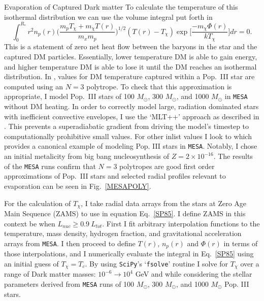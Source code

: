 \documentclass[a4paper,11pt]{article}
\begin{document}
\begin{section}{Evaporation of Captured Dark matter}
    To calculate the temperature of this isothermal distribution we can use the volume integral put forth in \cite{Spergel:1985}
    \begin{equation}
        \int_0^{R_*} r^2 n_p(r) \bigg(\frac{m_p T_\chi + m_\chi T(r)}{m_x m_p} \bigg)^{1/2} (T(r) - T_\chi) \exp \Big[ \frac{-m_\chi \Phi(r)}{k T_\chi} \Big] dr = 0.
        \label{SP85}
    \end{equation}
    This is a statement of zero net heat flow between the baryons in the star and the captured DM particles.
    Essentially, lower temperature DM is able to gain energy, and higher temperature DM is able to lose it until the DM reaches an isothermal distribution.
    In \cite{Ilie:2020popiii}, values for DM temperature captured within a Pop.~III star are computed using an $N=3$ polytrope.
    To check that this approximation is appropriate, I model Pop.~III stars of 100 $M_{\odot}$, 300 $M_{\odot}$, and 1000 $M_{\odot}$ in \texttt{MESA} without DM heating.
    In order to correctly model large, radiation dominated stars with inefficient convective envelopes, I use the `MLT++' approach as described in \cite{MESA:2013}.
    This prevents a superadiabatic gradient from driving the model's timestep to computationally prohibitive small values.
    For other inlist values I look to \cite{Windhorst:2019} which provides a canonical example of modeling Pop. III stars in \texttt{MESA}.
    Notably, I chose an initial metalicity from big bang nucleosynthesis of $Z = 2 \times 10^{-16}$.
    The results of the \texttt{MESA} runs confirm that $N=3$ polytropes are good first order approximations of Pop.~III stars and selected radial profiles relevant to evaporation can be seen in Fig.~\ref{MESAPOLY}.
    
    For the calculation of $T_\chi$, I take radial data arrays from the stars at Zero Age Main Sequence (ZAMS) to use in equation Eq.~\ref{SP85}.
    I define ZAMS in this context be when $L_{nuc} \geq 0.9 ~ L_{tot}$.
    First I fit arbitrary interpolation functions to the temperature, mass density, hydrogen fraction, and gravitational acceleration arrays from \texttt{MESA}.
    I then proceed to define $T(r)$, $n_p(r)$ and $\Phi(r)$ in terms of those interpolations, and I numerically evaluate the integral in Eq.~\ref{SP85} using an initial guess of $T_\chi = T_c$.
    By using \texttt{SciPy}'s `\texttt{fsolve}' routine I solve for $T_\chi$ over a range of Dark matter masses: {$10^{-6} \to 10^4$ GeV} and while considering the stellar parameters derived from \texttt{MESA} runs of 100 $M_\odot$, 300 $M_\odot$, and 1000 $M_\odot$ Pop. III stars. 


\end{section}
\end{document}
